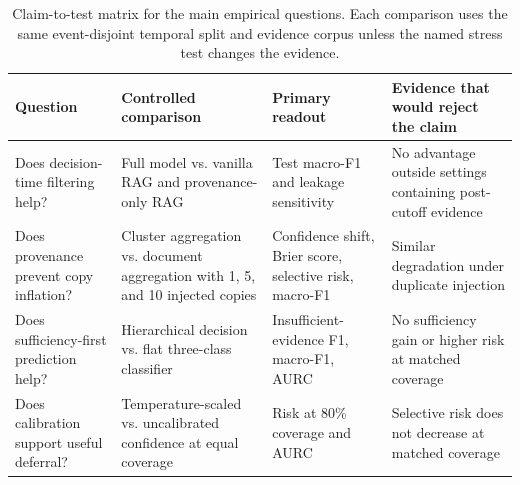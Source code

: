 \begin{table}[t]
\caption{Claim-to-test matrix for the main empirical questions. Each comparison uses the same event-disjoint temporal split and evidence corpus unless the named stress test changes the evidence.}
\label{tab:evaluation-matrix}
\centering
\footnotesize
\setlength{\tabcolsep}{4pt}
\renewcommand{\arraystretch}{1.12}
\begin{tabularx}{\textwidth}{>{\raggedright\arraybackslash}p{}YYY}
\toprule
\textbf{Question} & \textbf{Controlled comparison} & \textbf{Primary readout} & \textbf{Evidence that would reject the claim} \\
\midrule
Does decision-time filtering help? & Full model vs. vanilla RAG and provenance-only RAG & Test macro-F1 and leakage sensitivity & No advantage outside settings containing post-cutoff evidence \\
Does provenance prevent copy inflation? & Cluster aggregation vs. document aggregation with 1, 5, and 10 injected copies & Confidence shift, Brier score, selective risk, macro-F1 & Similar degradation under duplicate injection \\
Does sufficiency-first prediction help? & Hierarchical decision vs. flat three-class classifier & Insufficient-evidence F1, macro-F1, AURC & No sufficiency gain or higher risk at matched coverage \\
Does calibration support useful deferral? & Temperature-scaled vs. uncalibrated confidence at equal coverage & Risk at 80\% coverage and AURC & Selective risk does not decrease at matched coverage \\
\bottomrule
\end{tabularx}
\end{table}
